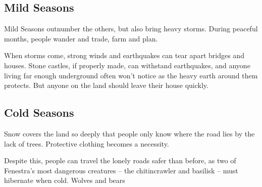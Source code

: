 \bigLine

\begin{multicols}{2}

\subsection{Mild Seasons}

Mild Seasons outnumber the others, but also bring heavy storms.
During peaceful months, people wander and trade, farm and plan.

When storms come, strong winds and earthquakes can tear apart bridges and houses.
Stone castles, if properly made, can withstand earthquakes, and anyone living far enough underground often won't notice as the heavy earth around them protects.
But anyone on the land should leave their house quickly.

\encMildVillages

\encMildEdge

\encMildForest

\end{multicols}

\bigLine

\begin{multicols}{2}

\subsection{Cold Seasons}

Snow covers the land so deeply that people only know where the road lies by the lack of trees.
Protective clothing becomes a necessity.

Despite this, people can travel the lonely roads safer than before, as two of Fenestra's most dangerous creatures -- the chitincrawler and basilisk -- must hibernate when cold.
Wolves and bears 

\encColdVillages

\encColdEdge

\encColdForest

\end{multicols}

\bigLine

